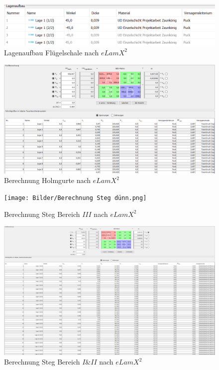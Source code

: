\begin{figure}[h]
	\includegraphics[width=1.0\textwidth]{Bilder/Lagenaufbau Haut.png}
	\caption{Lagenaufbau Flügelschale nach $eLamX^{2}$}
	\label{fig:Lagenaufbau Haut}
\end{figure}
\begin{figure}[h]
	\includegraphics[width=1.0\textwidth,angle=0]{Bilder/Berechnung Holmgurte.png}
	\caption{Berechnung Holmgurte nach $eLamX^{2}$}
	\label{fig:Berechnung Holmgurte}
\end{figure}
\begin{figure}[h]
	\texttt{[image: Bilder/Berechnung Steg dünn.png]}
	\caption{Berechnung Steg Bereich $III$ nach $eLamX^{2}$}
	\label{fig:Berechnung Steg dünn}
\end{figure}
\begin{figure}[h]
	\includegraphics[width=1.3\textwidth, angle=90]{Bilder/Berechnung Steg dick.png}
	\caption{Berechnung Steg Bereich $I$\&$II$ nach $eLamX^{2}$}
	\label{fig:Berechnung Steg dick}
\end{figure}
